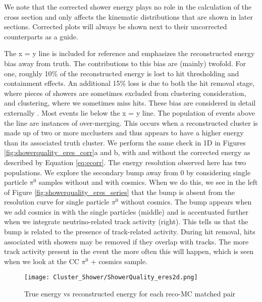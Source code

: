 \noindent We note that the corrected shower energy plays no role in the calculation of the cross section and only affects the kinematic distributions that are shown in later sections. Corrected plots will always be shown next to their uncorrected counterparts as a guide. 
\par The x = y line is included for reference and emphasizes the reconstructed energy bias away from truth. The contributions to this bias are (mainly) twofold. For one, roughly 10\% of the reconstructed energy is lost to hit thresholding and containment effects. An additional 15\% loss is due to both the hit removal stage, where pieces of showers are sometimes excluded from clustering consideration, and clustering, where we sometimes miss hits. These bias are considered in detail externally \cite{bib:davidc_hitthresholding} \cite{bib:davidc_missingE}. Most events lie below the x = y line. The population of events above the line are instances of over-merging. This occurs when a reconstructed cluster is made up of two or more mcclusters and thus appears to have a higher energy than its associated truth cluster. We perform the same check in 1D in Figures \ref{fig:showerquality_eres_corr}a and b, with and without the corrected energy as described by Equation \ref{eq:ecorr}. The energy resolution observed here has two populations.  We explore the secondary bump away from 0 by considering single particle $\pi^0$ samples without and with cosmics.  When we do this, we see in the left of Figure \ref{fig:showerquality_eres_series} that the bump is absent from the resolution curve for single particle $\pi^0$ without cosmics.  The bump appears when we add cosmics in with the single particles (middle) and is accentuated further when we integrate neutrino-related track activity (right). This tells us that the bump is related to the presence of track-related activity.  During hit removal, hits associated with showers may be removed if they overlap with tracks.  The more track activity present in the event the more often this will happen, which is seen when we look at the CC $\pi^0$ + cosmics sample.  

\begin{figure}[h!]
\centering
\texttt{[image: Cluster\_Shower/ShowerQuality\_eres2d.png]}
\caption{True energy vs reconstructed energy for each reco-MC matched pair}
\label{fig:showerquality_eres}
\end{figure}

